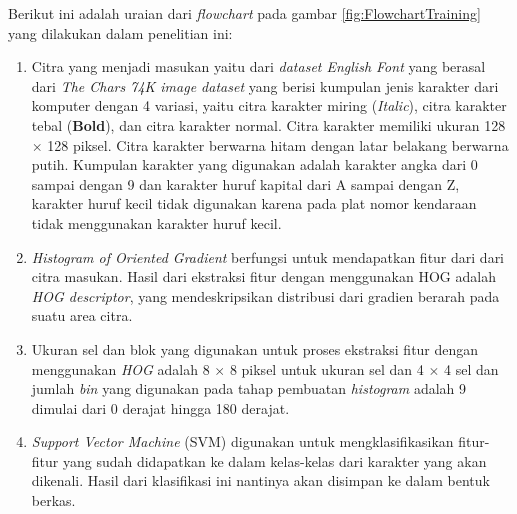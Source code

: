 Berikut ini adalah uraian dari \textit{flowchart} pada gambar \ref{fig:FlowchartTraining} yang dilakukan dalam penelitian ini:
\begin{enumerate}
\item Citra yang menjadi masukan yaitu dari \textit{dataset English Font} yang berasal dari \textit{The Chars 74K image dataset} yang berisi kumpulan jenis karakter dari komputer dengan 4 variasi, yaitu citra karakter miring (\textit{Italic}), citra karakter tebal (\textbf{Bold}), dan citra karakter normal. Citra karakter memiliki ukuran 128 $\times$ 128 piksel. Citra karakter berwarna hitam dengan latar belakang berwarna putih. Kumpulan karakter yang digunakan adalah karakter angka dari 0 sampai dengan 9 dan karakter huruf kapital dari A sampai dengan Z, karakter huruf kecil tidak digunakan karena pada plat nomor kendaraan tidak menggunakan karakter huruf kecil.
\item \textit{Histogram of Oriented Gradient} berfungsi untuk mendapatkan fitur dari dari citra masukan. Hasil dari ekstraksi fitur dengan menggunakan HOG adalah \textit{HOG descriptor}, yang mendeskripsikan distribusi dari gradien berarah pada suatu area citra.
\item Ukuran sel dan blok yang digunakan untuk proses ekstraksi fitur dengan menggunakan \textit{HOG} adalah 8 $\times$ 8 piksel untuk ukuran sel dan 4 $\times$ 4 sel dan jumlah \textit{bin} yang digunakan pada tahap pembuatan \textit{histogram} adalah 9 dimulai dari 0 derajat hingga 180 derajat.
\item \textit{Support Vector Machine} (SVM) digunakan untuk mengklasifikasikan fitur-fitur yang sudah didapatkan ke dalam kelas-kelas dari karakter yang akan dikenali. Hasil dari klasifikasi ini nantinya akan disimpan ke dalam bentuk berkas.\\
\end{enumerate}

